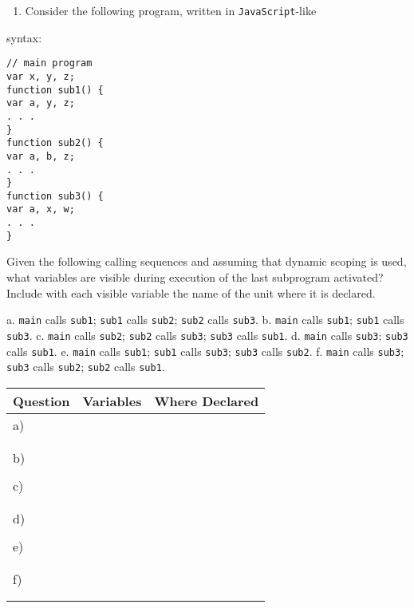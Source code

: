 \documentclass[11pt]{article}
\begin{document}
\begin{enumerate}
\item Consider the following program, written in \texttt{JavaScript}-like
\end{enumerate}
syntax:

\begin{verbatim}
// main program
var x, y, z;
function sub1() {
var a, y, z;
. . .
}
function sub2() {
var a, b, z;
. . .
}
function sub3() {
var a, x, w;
. . .
}  
\end{verbatim}


Given the following calling sequences and assuming that dynamic scoping
is used, what variables are visible during execution of the last subprogram
activated? Include with each visible variable the name of the unit
where it is declared.

a. \texttt{main} calls \texttt{sub1}; \texttt{sub1} calls \texttt{sub2}; \texttt{sub2} calls \texttt{sub3}.
b. \texttt{main} calls \texttt{sub1}; \texttt{sub1} calls \texttt{sub3}.
c. \texttt{main} calls \texttt{sub2}; \texttt{sub2} calls \texttt{sub3}; \texttt{sub3} calls \texttt{sub1}.
d. \texttt{main} calls \texttt{sub3}; \texttt{sub3} calls \texttt{sub1}.
e. \texttt{main} calls \texttt{sub1}; \texttt{sub1} calls \texttt{sub3}; \texttt{sub3} calls \texttt{sub2}.
f. \texttt{main} calls \texttt{sub3}; \texttt{sub3} calls \texttt{sub2}; \texttt{sub2} calls \texttt{sub1}.

\begin{center}
\begin{tabular}{lll}
\hline
Question & Variables & Where Declared\\
\hline
a) &  & \\
 &  & \\
 &  & \\
\hline
b) &  & \\
 &  & \\
\hline
c) &  & \\
 &  & \\
 &  & \\
\hline
d) &  & \\
 &  & \\
\hline
e) &  & \\
 &  & \\
 &  & \\
\hline
f) &  & \\
 &  & \\
 &  & \\
\hline
\end{tabular}
\end{center}
\end{document}
